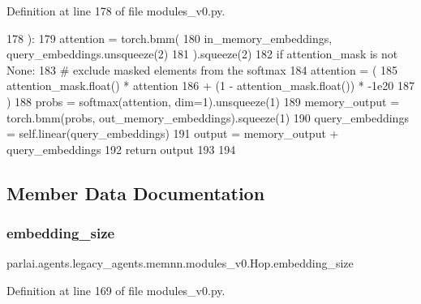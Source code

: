 Definition at line 178 of file modules\+\_\+v0.\+py.


\begin{DoxyCode}
178     ):
179         attention = torch.bmm(
180             in\_memory\_embeddings, query\_embeddings.unsqueeze(2)
181         ).squeeze(2)
182         \textcolor{keywordflow}{if} attention\_mask \textcolor{keywordflow}{is} \textcolor{keywordflow}{not} \textcolor{keywordtype}{None}:
183             \textcolor{comment}{# exclude masked elements from the softmax}
184             attention = (
185                 attention\_mask.float() * attention
186                 + (1 - attention\_mask.float()) * -1e20
187             )
188         probs = softmax(attention, dim=1).unsqueeze(1)
189         memory\_output = torch.bmm(probs, out\_memory\_embeddings).squeeze(1)
190         query\_embeddings = self.linear(query\_embeddings)
191         output = memory\_output + query\_embeddings
192         \textcolor{keywordflow}{return} output
193 
194 
\end{DoxyCode}


\subsection{Member Data Documentation}
\mbox{\label{classparlai_1_1agents_1_1legacy__agents_1_1memnn_1_1modules__v0_1_1Hop_ac291a01e4b365714a352d411f353bdc6}} 
\subsubsection{\texorpdfstring{embedding\+\_\+size}{embedding\_size}}
{\footnotesize\ttfamily parlai.\+agents.\+legacy\+\_\+agents.\+memnn.\+modules\+\_\+v0.\+Hop.\+embedding\+\_\+size}



Definition at line 169 of file modules\+\_\+v0.\+py.

\mbox{\label{classparlai_1_1agents_1_1legacy__agents_1_1memnn_1_1modules__v0_1_1Hop_ac96056089c04bfc0ed7ad4a364655956}} 
